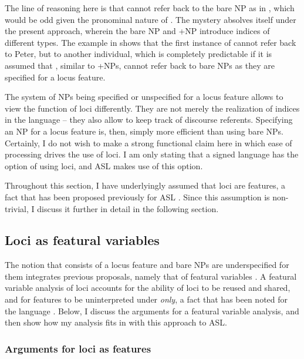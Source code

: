 \documentclass[output=paper,
modfonts
]{langscibook}
\begin{document}
The line of reasoning here is that  cannot refer back to the bare NP as in , which would be odd given the pronominal nature of . The mystery absolves itself under the present approach, wherein the bare NP and +NP introduce indices of different types. The example in  shows that the first instance of  cannot refer back to Peter, but to another individual, which is completely predictable if it is assumed that , similar to +NPs, cannot refer back to bare NPs as they are specified for a locus feature. 

The system of NPs being specified or unspecified for a locus feature allows to view the function of loci differently. They are not merely the realization of indices in the language -- they also allow to keep track of discourse referents. Specifying an NP for a locus feature is, then, simply more efficient than using bare NPs. Certainly, I do not wish to make a strong functional claim here in which ease of processing drives the use of loci. I am only stating that a signed language has the option of using loci, and ASL makes use of this option.  

Throughout this section, I have underlyingly assumed that loci are features, a fact that has been proposed previously for ASL \citep{Kuhn2015, Schlenker2014}. Since this assumption is non-trivial, I discuss it further in detail in the following section. 

\subsection{Loci as featural variables}\label{sec:irani:4.3}

The notion that  consists of a locus feature and bare NPs are underspecified for them integrates previous proposals, namely that of featural variables \citep{Schlenker2014}. A featural variable analysis of loci accounts for the ability of loci to be reused and shared, and for features to be uninterpreted under \textit{only}, a fact that has been noted for the language \citep{Kuhn2015}. Below, I discuss the arguments for a featural variable analysis, and then show how my analysis fits in with this approach to ASL. 

\subsubsection{Arguments for loci as features}
\end{document}
